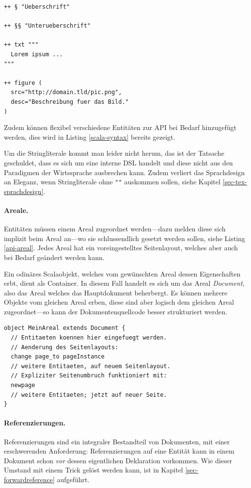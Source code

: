 \begin{lstlisting}[label=api-entity,caption=Entitäten hinzufügen.]
++ § "Ueberschrift"

++ §§ "Unterueberschrift"

++ txt """
  Lorem ipsum ...
"""

++ figure (
  src="http://domain.tld/pic.png",
  desc="Beschreibung fuer das Bild."
)
\end{lstlisting}

Zudem können flexibel verschiedene Entitäten zur API bei Bedarf
hinzugefügt werden, dies wird in Listing \ref{scala-syntax} bereits gezeigt.

Um die Stringliterale kommt man leider nicht herum, das ist der Tatsache
geschuldet, dass es sich um eine interne DSL handelt und diese nicht aus
den Paradigmen der Wirtssprache ausbrechen kann. Zudem verliert das Sprachdesign
an Eleganz, wenn Stringliterale ohne \verb+""+ auskommen sollen, siehe
Kapitel \ref{sec-tex-sprachdesign}.

\paragraph{Areale.}

Entitäten müssen einem Areal zugeordnet werden---dazu
melden diese sich implizit beim Areal an---wo
sie schlussendlich gesetzt werden sollen, siehe
Listing \ref{api-areal}. Jedes Areal
hat ein voreingestelltes Seitenlayout, welches aber auch bei Bedarf
geändert werden kann.

Ein odinäres Scalaobjekt, welches vom gewünschten Areal dessen Eigenschaften
erbt, dient als Container. In diesem Fall handelt es sich um das
Areal \emph{Document}, also das Areal welches das Hauptdokument beherbergt.
Es können mehrere Objekte vom gleichen Areal erben, diese sind aber logisch
dem gleichen Areal zugeordnet---so kann der Dokumentenquellcode besser
strukturiert werden.

\begin{lstlisting}[label=api-areal,caption=Areale bilden.]
object MeinAreal extends Document {
  // Entitaeten koennen hier eingefuegt werden.
  // Aenderung des Seitenlayouts:
  change page_to pageInstance
  // weitere Entitaeten, auf neuem Seitenlayout.
  // Expliziter Seitenumbruch funktioniert mit:
  newpage
  // weitere Entitaeten; jetzt auf neuer Seite.
}
\end{lstlisting}

\paragraph{Referenzierungen.} Referenzierungen sind ein
integraler Bestandteil von Dokumenten,
mit einer erschwerenden Anforderung: Referenzierungen auf eine Entität kann
in einem Dokument schon \emph{vor} dessen eigentlichen Deklaration vorkommen.
Wie dieser Umstand mit einem Trick gelöst werden kann, ist in Kapitel
\ref{sec-forwardreference} aufgeführt.

